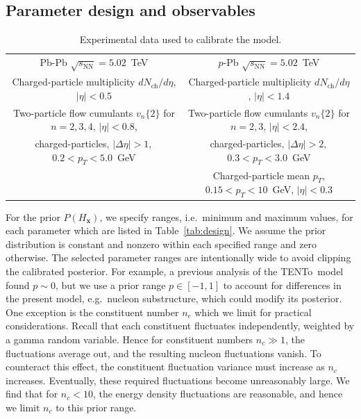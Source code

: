 \documentclass[aps,prc,reprint,amsmath,nofootinbib]{revtex4-1}
\newcommand{\trento}{T\raisebox{-0.5ex}{R}ENTo}
\newcommand{\sqrts}{\sqrt{s_\mathrm{NN}}}
\newcommand{\nch}{N_\text{ch}}
\newcommand{\vnk}[2]{v_#1\{#2\}}
\newcommand{\xv}{\mathbf x}
\newcommand{\paddedhline}{\noalign{\smallskip}\hline\noalign{\smallskip}}
\begin{document}
\subsection{Parameter design and observables}
\label{sec:observables}

\begin{table}
  \caption{
    \label{tab:observables}
    Experimental data used to calibrate the model.
  }
  \begin{ruledtabular}
  \begin{tabular}{cc}
    Pb-Pb $\sqrts=5.02$~TeV & $p$-Pb $\sqrts=5.02$~TeV \\
    \paddedhline
    Charged-particle multiplicity $d\nch/d\eta$, $|\eta| < 0.5$ \cite{Adam:2015ptt} & Charged-particle multiplicity $d\nch/d\eta$, $|\eta| < 1.4$ \cite{Adam:2014qja} \\
    \noalign{\smallskip}
  Two-particle flow cumulants  $\vnk{n}{2}$ for $n=2,3,4$, $|\eta| < 0.8$,  & Two-particle flow cumulants $\vnk{n}{2}$ for $n=2,3$, $|\eta| < 2.4$, \\
    charged-particles, $|\Delta\eta| > 1$,\, $0.2 < p_T < 5.0$~GeV \cite{Adam:2016izf} & charged-particles, $|\Delta\eta| > 2$,\, $0.3 < p_T < 3.0$~GeV \cite{Chatrchyan:2013nka}\\
    \noalign{\smallskip}
    & Charged-particle mean $p_T$, $0.15 < p_T < 10$~GeV, $|\eta| < 0.3$ \cite{Abelev:2013bla}\\
  \end{tabular}
  \end{ruledtabular}
\end{table}

For the prior $P(H_\xv)$, we specify ranges, i.e.\ minimum and maximum values, for each parameter which are listed in Table~\ref{tab:design}.
We assume the prior distribution is constant and nonzero within each specified range and zero otherwise.
The selected parameter ranges are intentionally wide to avoid clipping the calibrated posterior.
For example, a previous analysis of the \trento\ model \cite{Bernhard:2016tnd} found $p \sim 0$, but we use a prior range $p \in [-1, 1]$ to account for differences in the present model, e.g.\ nucleon substructure, which could modify its posterior.
One exception is the constituent number $n_c$ which we limit for practical considerations.
Recall that each constituent fluctuates independently, weighted by a gamma random variable.
Hence for constituent numbers $n_c \gg 1$, the fluctuations average out, and the resulting nucleon fluctuations vanish.
To counteract this effect, the constituent fluctuation variance must increase as $n_c$ increases.
Eventually, these required fluctuations become unreasonably large.
We find that for $n_c < 10$, the energy density fluctuations are reasonable, and hence we limit $n_c$ to this prior range.
\end{document}
